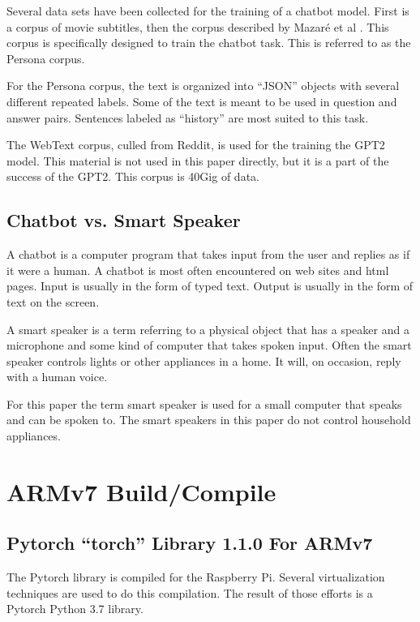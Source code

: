 Several data sets have been collected for the training of a chatbot model. First is a corpus of movie subtitles, then the corpus described by Mazar{\'{e}} et al \cite{DBLP:journals/corr/abs-1809-01984}. This corpus is specifically designed to train the chatbot task. This is referred to as the Persona corpus.

For the Persona corpus, the text is organized into ``JSON'' objects with several different repeated labels. Some of the text is meant to be used in question and answer pairs. Sentences labeled as ``history'' are most suited to this task. %

The WebText corpus, culled from Reddit, is used for the training the GPT2 model. This material is not used in this paper directly, but it is a part of the success of the GPT2. This corpus is 40Gig of data.

\subsection{Chatbot vs. Smart Speaker}

A chatbot is a computer program that takes input from the user and replies as if it were a human. A chatbot is most often encountered on web sites and html pages. Input is usually in the form of typed text. Output is usually in the form of text on the screen.

A smart speaker is a term referring to a physical object that has a speaker and a microphone and some kind of computer that takes spoken input. Often the smart speaker controls lights or other appliances in a home. It will, on occasion, reply with a human voice. 

For this paper the term smart speaker is used for a small computer that speaks and can be spoken to. The smart speakers in this paper do not control household appliances.

\section{ARMv7 Build/Compile}

\subsection{Pytorch ``torch'' Library 1.1.0 For ARMv7}
The Pytorch library is compiled for the Raspberry Pi. Several virtualization techniques are used to do this compilation. The result of those efforts is a Pytorch Python 3.7 library. %

